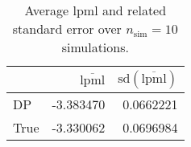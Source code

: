 \begin{table}[H]

\caption{Average lpml and related standard error over $n_{\text{sim}} = 10$ simulations.}
\centering
\begin{tabular}[t]{lrr}
\toprule
  & $\overbar{\text{lpml}}$ & $\text{sd}(\overbar{\text{lpml}})$\\
\midrule
DP & -3.383470 & 0.0662221\\
True & -3.330062 & 0.0696984\\
\bottomrule
\end{tabular}
\end{table}